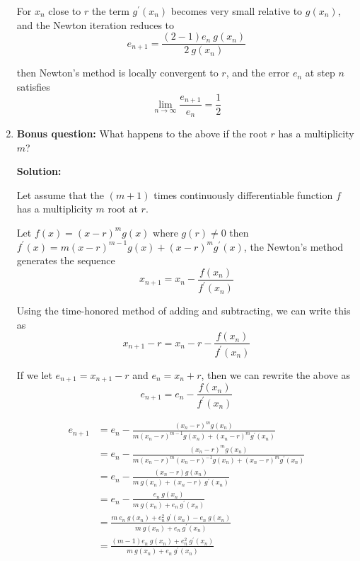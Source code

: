 \documentclass[a4paper,11pt]{report}
\begin{document}
\begin{enumerate}
    For $x_{n}$ close to $r$ the term $g^{\prime}(x_{n})$ becomes very small relative to $g(x_{n})$, and the Newton iteration reduces to
    \begin{equation*}
    e_{n+1} = \frac{(2-1)e_{n}\ g(x_{n})}{2\ g(x_{n})}
    \end{equation*}

    then Newton's method is locally convergent to $r$, and the error $e_{n}$ at step $n$ satisfies
    \begin{equation*}
    \lim_{n \rightarrow \infty} \frac{e_{n+1}}{e_{n}} = \frac{1}{2}
    \end{equation*}


    \item \textbf{Bonus question:} What happens to the above if the root $r$ has
     a multiplicity $m$?
    
    \textbf{Solution:}

    Let assume that the $(m+1)$ times continuously differentiable function $f$ has a multiplicity $m$ root at $r$. 

    Let $f(x) = (x-r)^{m} g(x)$ where $g(r) \neq 0$ then $f^{\prime}(x) = m(x-r)^{m-1} g(x) + (x-r)^{m} g^{\prime}(x)$, the Newton's method generates the sequence
    \begin{equation*}
    x_{n+1} = x_{n} - \frac{f(x_{n})}{f^{\prime}(x_{n})} 
    \end{equation*}

    Using the time-honored method of adding and subtracting, we can write this as
    \begin{equation*}
    x_{n+1} - r = x_{n} - r - \frac{f(x_{n})}{f^{\prime}(x_{n})}
    \end{equation*}
    
    If we let $e_{n+1} = x_{n+1} - r$ and $e_{n} = x_{n} + r$, then we can rewrite the above as
    \begin{equation*}
    e_{n+1} = e_{n} - \frac{f(x_{n})}{f^{\prime}(x_{n})}
    \end{equation*}

    \begin{equation*}
    \begin{aligned}
    e_{n+1} &= e_{n} - \frac{(x_{n} - r)^{m} g(x_{n})}{m(x_{n} - r)^{m-1} g(x_{n}) + (x_{n} - r)^{m} g^{\prime}(x_{n})} \\
            &= e_{n} - \frac{(x_{n} - r)^{m} g(x_{n})}{m(x_{n} - r)^{m} (x_{n} - r)^{-1} g(x_{n}) + (x_{n} - r)^{m} g^{\prime}(x_{n})} \\
            &= e_{n} - \frac{(x_{n} - r) g(x_{n})}{m\ g(x_{n}) + (x_{n} - r)\ g^{\prime}(x_{n})} \\
            &= e_{n} - \frac{e_{n}\ g(x_{n})}{m\ g(x_{n}) + e_{n}\ g^{\prime}(x_{n})} \\
            &= \frac{m\ e_{n}\ g(x_{n}) + e_{n}^{2}\ g^{\prime}(x_{n}) - e_{n}\ g(x_{n})}{m\ g(x_{n}) + e_{n}\ g^{\prime}(x_{n})} \\
            &= \frac{(m - 1)e_{n}\ g(x_{n}) + e_{n}^{2}\ g^{\prime}(x_{n})}{m\ g(x_{n}) + e_{n}\ g^{\prime}(x_{n})}
    \end{aligned}
    \end{equation*}
    

\end{enumerate}
\end{document}
